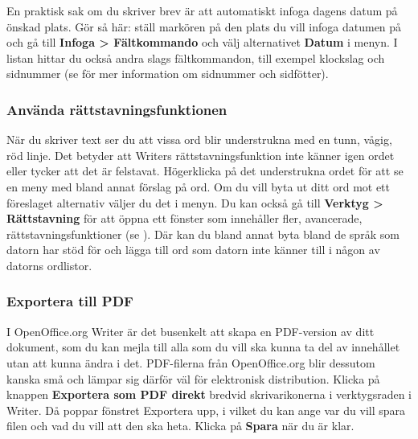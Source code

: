 \documentclass[a4paper,final]{memoir} %
\begin{document}

En praktisk sak om du skriver brev är att automatiskt infoga dagens datum på önskad plats. Gör så här: ställ markören på den plats du vill infoga datumen på och gå till \textbf{Infoga \textgreater{} Fältkommando} och välj alternativet \textbf{Datum} i menyn. I listan hittar du också andra slags fältkommandon, till exempel klockslag och sidnummer (se  för mer information om sidnummer och sidfötter).

\subsubsection{Använda rättstavningsfunktionen}


När du skriver text ser du att vissa ord blir understrukna med en tunn, vågig, röd linje. Det betyder att Writers rättstavningsfunktion inte känner igen ordet eller tycker att det är felstavat. Högerklicka på det understrukna ordet för att se en meny med bland annat förslag på ord. Om du vill byta ut ditt ord mot ett föreslaget alternativ väljer du det i menyn. Du kan också gå till \textbf{Verktyg \textgreater{} Rättstavning} för att öppna ett fönster som innehåller fler, avancerade, rättstavningsfunktioner (se ). Där kan du bland annat byta bland de språk som datorn har stöd för och lägga till ord som datorn inte känner till i någon av datorns ordlistor.


\subsubsection{Exportera till PDF}


I OpenOffice.org Writer är det busenkelt att skapa en PDF-version av ditt dokument, som du kan mejla till alla som du vill ska kunna ta del av innehållet utan att kunna ändra i det. PDF-filerna från OpenOffice.org blir dessutom kanska små och lämpar sig därför väl för elektronisk distribution. Klicka på knappen \textbf{Exportera som PDF direkt} bredvid skrivarikonerna i verktygsraden i Writer. Då poppar fönstret Exportera upp, i vilket du kan ange var du vill spara filen och vad du vill att den ska heta. Klicka på \textbf{Spara} när du är klar.
\end{document}
